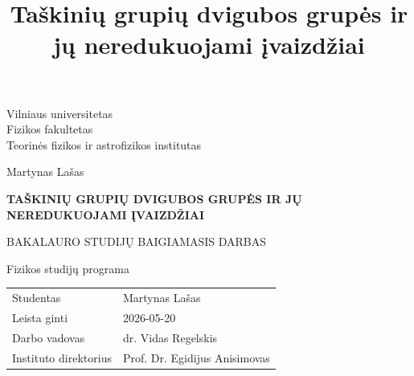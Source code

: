 \documentclass{article}
\theoremstyle{definition}
\theoremstyle{plain}
\theoremstyle{remark}
\numberwithin{equation}{section}
\begin{document}
\title{Taškinių grupių dvigubos grupės ir jų neredukuojami įvaizdžiai}


\rhead{}

\lhead{}

\cfoot{\thepage}

\normalfont


\thispagestyle{empty}
\begin{center}
Vilniaus universitetas\\
Fizikos fakultetas\\
Teorinės fizikos ir astrofizikos institutas
\par\end{center}

\vspace{3.5cm}

\begin{center}
	Martynas Lašas
\par\end{center}

\begin{center}
\textbf{TAŠKINIŲ GRUPIŲ DVIGUBOS GRUPĖS IR JŲ NEREDUKUOJAMI ĮVAIZDŽIAI}\vspace{0.8cm}
\par\end{center}

\begin{center}
BAKALAURO STUDIJŲ BAIGIAMASIS DARBAS 
\par\end{center}

\begin{center}
\vspace{0.8cm}
Fizikos studijų programa
\par\end{center}

\begin{center}
\vspace{3.5cm}
\par\end{center}

\begin{tabular*}{0.9\textwidth}{@{\extracolsep{\fill}}ll}
Studentas & Martynas Lašas
\tabularnewline[0.5cm]
	Leista ginti & 2026-05-20
	\tabularnewline
Darbo vadovas & dr. Vidas Regelskis
\tabularnewline[0.5cm]
	Instituto direktorius & Prof. Dr. Egidijus Anisimovas
	\tabularnewline
\end{tabular*}
\begin{center}
\vfill{}
\par\end{center}
\end{document}
